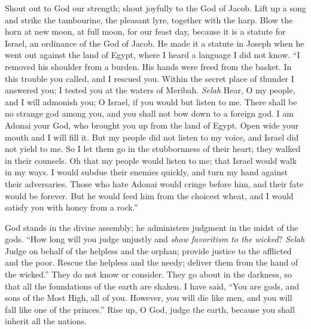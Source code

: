 \begin{biblechapter} %
 Shout out to God our strength; 
shout joyfully to the God of Jacob.
\verse Lift up a song and strike the tambourine, 
the pleasant lyre, together with the harp.
\verse Blow the horn at new moon, 
at full moon, for our feast day,
\verse because it is a statute for Israel, 
an ordinance of the God of Jacob.
\verse He made it a statute in Joseph 
when he went out against the land of Egypt, 
where I heard a language I did not know.
\verse “I removed his shoulder from a burden. 
His hands were freed from the basket.
\verse In this trouble you called, and I rescued you. 
Within the secret place of thunder I answered you; 
I tested you at the waters of Meribah. \textit{Selah}
\verse Hear, O my people, and I will admonish you; 
O Israel, if you would but listen to me.
\verse There shall be no strange god among you, 
and you shall not bow down to a foreign god.
\verse I am Adonai your God, 
who brought you up from the land of Egypt. 
Open wide your mouth and I will fill it.
\verse But my people did not listen to my voice, 
and Israel did not yield to me.
\verse So I let them go in the stubbornness of their heart; 
they walked in their counsels.
\verse Oh that my people would listen to me; 
that Israel would walk in my ways.
\verse I would subdue their enemies quickly, 
and turn my hand against their adversaries.
\verse Those who hate Adonai would cringe before him, 
and their fate would be forever.
\verse But he would feed him from the choicest wheat, 
and I would satisfy you with honey from a rock.”
\end{biblechapter}

\begin{biblechapter} %
 God stands in the divine assembly; 
he administers judgment in the midst of the gods.
\verse “How long will you judge unjustly 
and \textit{show favoritism to the wicked}? \textit{Selah}
\verse Judge on behalf of the helpless and the orphan; 
provide justice to the afflicted and the poor.
\verse Rescue the helpless and the needy; 
deliver them from the hand of the wicked.”
\verse They do not know or consider. 
They go about in the darkness, 
so that all the foundations of the earth are shaken.
\verse I have said, “You are gods, 
and sons of the Most High, all of you.
\verse However, you will die like men, 
and you will fall like one of the princes.”
\verse Rise up, O God, judge the earth, 
because you shall inherit all the nations.
\end{biblechapter}

